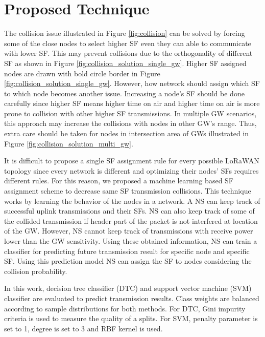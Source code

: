 \documentclass[conference]{IEEEtran}
\begin{document}
\section{Proposed Technique} \label{Proposed Technique}
\par The collision issue illustrated in Figure \ref{fig:collision} can be solved by forcing some of the close nodes to select higher SF even they can able to communicate with lower SF. This may prevent collisions due to the orthogonality of different SF as shown in Figure \ref{fig:collision_solution_single_gw}. Higher SF assigned nodes are drawn with bold circle border in Figure \ref{fig:collision_solution_single_gw}. However, how network should assign which SF to which node becomes another issue. Increasing a node's SF should be done carefully since higher SF means higher time on air and higher time on air is more prone to collision with other higher SF transmissions. In multiple GW scenarios, this approach may increase the collisions with nodes in other GW's range. Thus, extra care should be taken for nodes in intersection area of GWs illustrated in Figure \ref{fig:collision_solution_multi_gw}.

\par It is difficult to propose a single SF assignment rule for every possible LoRaWAN topology since every network is different and optimizing their nodes' SFs requires different rules. For this reason, we proposed a machine learning based SF assignment scheme to decrease same SF transmission collisions. This technique works by learning the behavior of the nodes in a network. A NS can keep track of successful uplink transmissions and their SFs. NS can also keep track of some of the collided transmission if header part of the packet is not interfered at location of the GW. However, NS cannot keep track of transmissions with receive power lower than the GW sensitivity. Using these obtained information, NS can train a classifier for predicting future transmission result for specific node and specific SF. Using this prediction model NS can assign the SF to nodes considering the collision probability.

\par In this work, decision tree classifier (DTC) and support vector machine (SVM) classifier are evaluated to predict transmission results. Class weights are balanced according to sample distributions for both methods. For DTC, Gini impurity criteria is used to measure the quality of a splits. For SVM, penalty parameter is set to 1, degree is set to 3 and RBF kernel is used.
\end{document}
